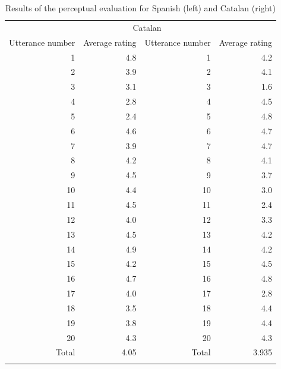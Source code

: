 \documentclass[output=paper]{langsci/langscibook}
\begin{document}
\begin{table}
\footnotesize
\begin{tabular}{rr@{\hspace{5mm}}rr}
\lsptoprule
\multicolumn{2}{c}{Spanish} & \multicolumn{2}{c}{Catalan}\\\cmidrule(lr){1-2}\cmidrule(lr){3-4}
Utterance number & Average rating & Utterance number & Average rating\\
\midrule
1 & 4.8 & 1 & 4.2\\
2 & 3.9 & 2 & 4.1\\
3 & 3.1 & 3 & 1.6\\
4 & 2.8 & 4 & 4.5\\
5 & 2.4 & 5 & 4.8\\
6 & 4.6 & 6 & 4.7\\
7 & 3.9 & 7 & 4.7\\
8 & 4.2 & 8 & 4.1\\
9 & 4.5 & 9 & 3.7\\
10 & 4.4 & 10 & 3.0\\
11 & 4.5 & 11 & 2.4\\
12 & 4.0 & 12 & 3.3\\
13 & 4.5 & 13 & 4.2\\
14 & 4.9 & 14 & 4.2\\
15 & 4.2 & 15 & 4.5\\
16 & 4.7 & 16 & 4.8\\
17 & 4.0 & 17 & 2.8\\
18 & 3.5 & 18 & 4.4\\
19 & 3.8 & 19 & 4.4\\
20 & 4.3 & 20 & 4.3\\
\midrule 
Total & 4.05 & Total & 3.935\\
\lspbottomrule
\end{tabular}
\caption{Results of the perceptual evaluation for Spanish (left) and Catalan (right) \citep{Garrido2010}}
\label{tab:gar:3}
\end{table}
\end{document}
